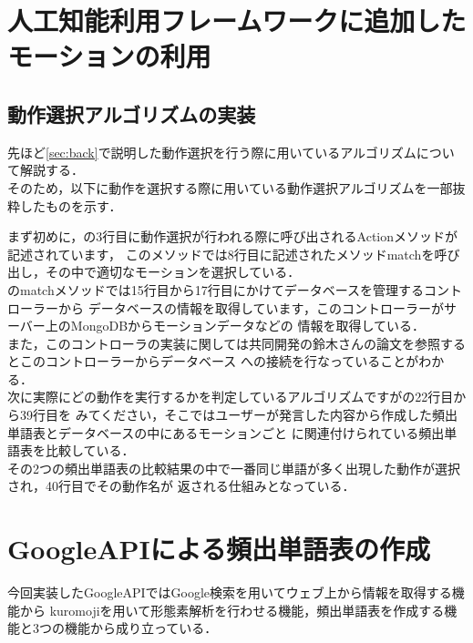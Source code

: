 
\section{人工知能利用フレームワークに追加したモーションの利用}\label{sec:motion}
\subsection{動作選択アルゴリズムの実装}
先ほど\ref{sec:back}で説明した動作選択を行う際に用いているアルゴリズムについて解説する．\\

そのため，以下に動作を選択する際に用いている動作選択アルゴリズムを一部抜粋したものを示す．


まず初めに，の3行目に動作選択が行われる際に呼び出されるActionメソッドが記述されています，
このメソッドでは8行目に記述されたメソッドmatchを呼び出し，その中で適切なモーションを選択している．\\

のmatchメソッドでは15行目から17行目にかけてデータベースを管理するコントローラーから
データベースの情報を取得しています，このコントローラーがサーバー上のMongoDBからモーションデータなどの
情報を取得している．
\\
また，このコントローラの実装に関しては共同開発の鈴木さんの論文を参照するとこのコントローラーからデータベース
への接続を行なっていることがわかる．
\\

次に実際にどの動作を実行するかを判定しているアルゴリズムですがの22行目から39行目を
みてください，そこではユーザーが発言した内容から作成した頻出単語表とデータベースの中にあるモーションごと
に関連付けられている頻出単語表を比較している．\\

その2つの頻出単語表の比較結果の中で一番同じ単語が多く出現した動作が選択され，40行目でその動作名が
返される仕組みとなっている．\\




\section{GoogleAPIによる頻出単語表の作成}
今回実装したGoogleAPIではGoogle検索を用いてウェブ上から情報を取得する機能から
kuromojiを用いて形態素解析を行わせる機能，頻出単語表を作成する機能と3つの機能から成り立っている．
\\
